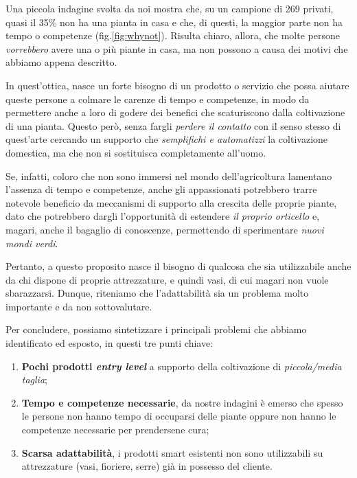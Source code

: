 Una piccola indagine svolta da noi mostra che, su un campione di 269 privati, quasi il 35\% non ha una pianta in casa e che, di questi, la maggior parte non ha tempo o competenze (fig.\ref{fig:whynot}).
Risulta chiaro, allora, che molte persone \textit{vorrebbero} avere una o più piante in casa, ma non possono a causa dei motivi che abbiamo appena descritto.

In quest'ottica, nasce un forte bisogno di un prodotto o servizio che possa aiutare queste persone a colmare le carenze di tempo e competenze, in modo da permettere anche a loro di godere dei benefici che scaturiscono dalla coltivazione di una pianta. Questo però, senza fargli \textit{perdere il contatto} con il senso stesso di quest'arte cercando un supporto che \textit{semplifichi e automatizzi} la coltivazione domestica, ma che non si sostituisca completamente all'uomo.

Se, infatti, coloro che non sono immersi nel mondo dell'agricoltura lamentano l'assenza di tempo e competenze, anche gli appassionati potrebbero trarre notevole beneficio da meccanismi di supporto alla crescita delle proprie piante, dato che potrebbero dargli l'opportunità di estendere \textit{il proprio orticello} e, magari, anche il bagaglio di conoscenze, permettendo di sperimentare \textit{nuovi mondi verdi}.

Pertanto, a questo proposito nasce il bisogno di qualcosa che sia utilizzabile anche da chi dispone di proprie attrezzature, e quindi vasi, di cui magari non vuole sbarazzarsi.
Dunque, riteniamo che l'adattabilità sia un problema molto importante e da non sottovalutare.

Per concludere, possiamo sintetizzare i principali problemi che abbiamo identificato ed esposto, in questi tre punti chiave:
\begin{enumerate}
	\item \textbf{Pochi prodotti \textit{entry level}} a supporto della coltivazione di \textit{piccola/media taglia};
	
	\item \textbf{Tempo e competenze necessarie}, da nostre indagini è emerso che spesso le persone non hanno tempo di occuparsi delle piante oppure non hanno le competenze necessarie per prendersene cura;
	
	\item \textbf{Scarsa adattabilità}, i prodotti smart esistenti non sono utilizzabili su attrezzature (vasi, fioriere, serre) già in possesso del cliente.
\end{enumerate}

